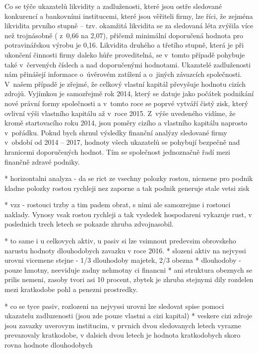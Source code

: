 Co se týče ukazatelů likvidity a zadluženosti, které jsou ostře sledované konkurencí a bankovními institucemi, které jsou věřiteli firmy, lze říci, že zejména likvidita prvního stupně – tzv. okamžitá likvidita se za sledovaná léta zvýšila více než trojnásobně ( z~0,66 na 2,07), přičemž minimální doporučená hodnota pro potravinářskou výrobu je 0,16. Likvidita druhého a třetího stupně, která je při ukončení činnosti firmy daleko hůře proveditelná, se v~tomto případě pohybuje také v~červených číslech a nad doporučenými hodnotami. Ukazatelé zadluženosti nám přinášejí informace o~úvěrovém zatížení a o~jiných závazcích společnosti. V~našem případě je zřejmé, že celkový vlastní kapitál převyšuje hodnotu cizích zdrojů. Vyjímkou je samozřejmě rok 2014, který se datuje jako počátek podnikání nové právní formy společnosti a v~tomto roce se poprvé vytváří čistý zisk, který ovlivní výši vlastního kapitálu až v~roce 2015. Z~výše uvedeného vidíme, že kromě startovacího roku 2014, jsou poměry cizího a vlastního kapitálu naprosto v~pořádku. 
Pokud bych shrnul výsledky finanční analýzy sledované firmy v~období od 2014 – 2017, hodnoty všech
ukazatelů se pohybují bezpečně nad hranicemi doporučených hodnot. Tím se společnost jednoznačně řadí mezi finančně zdravé podniky.



* horizontalni analyza - da se rict ze vsechny polozky rostou, nicmene pro podnik kladne polozky rostou rychleji nez zaporne a tak podnik generuje stale vetsi zisk 

* vzz - rostouci trzby a tim padem obrat, s nimi ale samozrejme i rostouci naklady. Vynosy vsak rostou rychleji a tak vysledek hospodareni vykazuje rust, v poslednich trech letech se pokazde zhruba zdvojnasobil.

* to same i u celkovych aktiv, u pasiv si lze vsimnout predevsim obrovskeho narustu hodnoty dlouhodobych zavazku v roce 2016.
* slozeni aktiv na nejvyssi urovni vicemene stejne - 1/3 dlouhodoby majetek, 2/3 obezna
* dlouhodoby - pouze hmotny, neeviduje zadny nehmotny ci financni
* ani struktura obeznych se prilis nemeni, zasoby tvori asi 10 procent, zbytek je zhruba stejnymi dily rozdelen mezi kratkodobe pohl a penezni prostredky.

* co se tyce pasiv, rozlozeni na nejvyssi urovni lze sledovat spise pomoci ukazatelu zadluzenosti (jsou zde pouze vlastni a cizi kapital)
* veskere cizi zdroje jsou zavazky uverovym institucim, v prvnich dvou sledovanych letech vyrazne prevazovaly kratkodobe, v dalsich dvou letech je hodnota kratkodobych skoro rovna hodnote dlouhodobych

